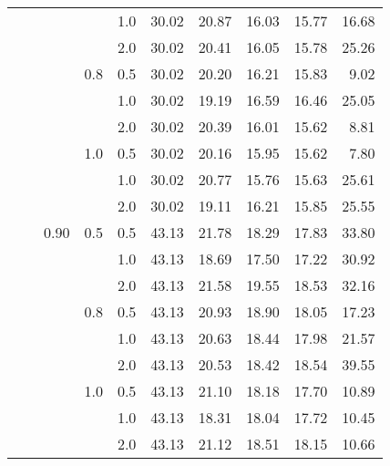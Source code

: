 \documentclass{article}
\begin{document}
{\begin{tabular}{lllllrrrrr}
            &     &      &     & 1.0 &   30.02 &   20.87 &             16.03 &                15.77 &      16.68 \\
            &     &      &     & 2.0 &   30.02 &   20.41 &             16.05 &                15.78 &      25.26 \\
            &     &      & 0.8 & 0.5 &   30.02 &   20.20 &             16.21 &                15.83 &       9.02 \\
            &     &      &     & 1.0 &   30.02 &   19.19 &             16.59 &                16.46 &      25.05 \\
            &     &      &     & 2.0 &   30.02 &   20.39 &             16.01 &                15.62 &       8.81 \\
            &     &      & 1.0 & 0.5 &   30.02 &   20.16 &             15.95 &                15.62 &       7.80 \\
            &     &      &     & 1.0 &   30.02 &   20.77 &             15.76 &                15.63 &      25.61 \\
            &     &      &     & 2.0 &   30.02 &   19.11 &             16.21 &                15.85 &      25.55 \\
            &     & 0.90 & 0.5 & 0.5 &   43.13 &   21.78 &             18.29 &                17.83 &      33.80 \\
            &     &      &     & 1.0 &   43.13 &   18.69 &             17.50 &                17.22 &      30.92 \\
            &     &      &     & 2.0 &   43.13 &   21.58 &             19.55 &                18.53 &      32.16 \\
            &     &      & 0.8 & 0.5 &   43.13 &   20.93 &             18.90 &                18.05 &      17.23 \\
            &     &      &     & 1.0 &   43.13 &   20.63 &             18.44 &                17.98 &      21.57 \\
            &     &      &     & 2.0 &   43.13 &   20.53 &             18.42 &                18.54 &      39.55 \\
            &     &      & 1.0 & 0.5 &   43.13 &   21.10 &             18.18 &                17.70 &      10.89 \\
            &     &      &     & 1.0 &   43.13 &   18.31 &             18.04 &                17.72 &      10.45 \\
            &     &      &     & 2.0 &   43.13 &   21.12 &             18.51 &                18.15 &      10.66 \\

\end{tabular}}
\end{document}
